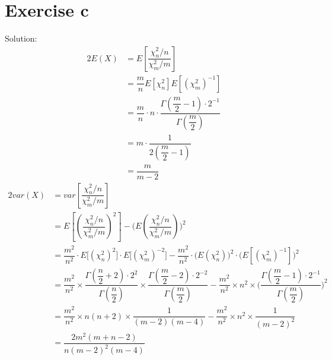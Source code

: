 \documentclass[a4papers]{ctexart}
\begin{document}
\section*{Exercise c}
\noindent Solution:\
\[  \]
\begin{alignat*}{2}
    E(X) 
    &= E\left[\dfrac{\chi^2_{n}/n}{\chi^2_{m}/m}\right] \\
    &= \dfrac{m}{n}E\left[\chi^2_{n} \right] E\left[ (\chi^2_{m})^{-1} \right] \\
    &= \dfrac{m}{n}\cdot n\cdot \dfrac{\Gamma(\dfrac{m}{2}-1)\cdot 2^{-1} }{\Gamma(\dfrac{m}{2})} \\
    &= m \cdot \dfrac{1}{2(\dfrac{m}{2}-1)}\\
    &= \dfrac{m}{m-2}
\end{alignat*}
\begin{alignat*}{2}
    var(X)
    &= var\left[\dfrac{\chi^2_{n}/n}{\chi^2_{m}/m} \right]\\
    &= E\left[\left(\dfrac{\chi^2_{n}/n}{\chi^2_{m}/m}\right)^2\right]-\Bigg(E\left(\dfrac{\chi^2_{n}/n}{\chi^2_{m}/m} \right)\Bigg)^2\\
    &=\dfrac{m^2}{n^2} \cdot E\Big[(\chi^2_n)^2\Big] \cdot E\Big[(\chi^2_m)^{-2} \Big]
        - \dfrac{m^2}{n^2}\cdot \Big(E(\chi^2_n) \Big)^2 \cdot \Big(E\left[(\chi^2_m)^{-1}\right] \Big)^2\\
    &=\dfrac{m^2}{n^2} \times \dfrac{\Gamma(\dfrac{n}{2}+2)\cdot 2^{2} }{\Gamma(\dfrac{n}{2})} \times \dfrac{\Gamma(\dfrac{m}{2}-2)\cdot 2^{-2} }{\Gamma(\dfrac{m}{2})} 
        - \dfrac{m^2}{n^2}\times n^2 \times \Big( \dfrac{\Gamma(\dfrac{m}{2}-1)\cdot 2^{-1} }{\Gamma(\dfrac{m}{2})}  \Big)^2\\
    &= \dfrac{m^2}{n^2} \times n(n+2) \times \dfrac{1}{(m-2)(m-4)}
        - \dfrac{m^2}{n^2} \times n^2 \times \dfrac{1}{(m-2)^2}\\
    &= \dfrac{2m^2(m+n-2)}{n(m-2)^2(m-4)}
\end{alignat*}
\end{document}

